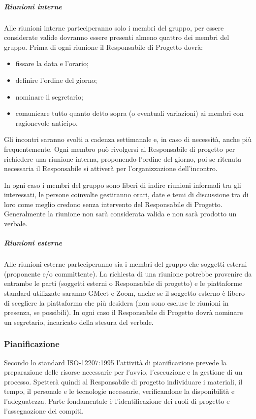\subparagraph{Riunioni interne}
Alle riunioni interne parteciperanno solo i membri del gruppo, per essere considerate valide dovranno essere presenti almeno quattro dei membri del gruppo. Prima di ogni riunione il Responsabile di Progetto dovrà:
\begin{itemize}
\item fissare la data e l'orario;
\item definire l'ordine del giorno;
\item nominare il segretario;
\item comunicare tutto quanto detto sopra (o eventuali variazioni) ai membri con ragionevole anticipo.
\end{itemize}

Gli incontri saranno svolti a cadenza settimanale e, in caso di necessità, anche più frequentemente.
Ogni membro può rivolgersi al Responsabile di progetto per richiedere una riunione interna, proponendo l'ordine del giorno, poi se ritenuta necessaria il Responsabile si attiverà per l'organizzazione dell'incontro.

In ogni caso i membri del gruppo sono liberi di indire riunioni informali tra gli interessati, le persone coinvolte gestiranno orari, date e temi di discussione tra di loro come meglio credono senza intervento del Responsabile di Progetto.
Generalmente la riunione non sarà considerata valida e non sarà prodotto un verbale.

\subparagraph{Riunioni esterne}
Alle riunioni esterne parteciperanno sia i membri del gruppo che soggetti esterni (proponente e/o committente). La richiesta di una riunione potrebbe provenire da entrambe le parti (soggetti esterni o Responsabile di progetto) e le piattaforme standard utilizzate saranno GMeet e Zoom, anche se il soggetto esterno è libero di scegliere la piattaforma che più desidera (non sono escluse le riunioni in presenza, se possibili). In ogni caso il Responsabile di Progetto dovrà nominare un segretario, incaricato della stesura del verbale.


\subsubsection{Pianificazione}
Secondo lo standard ISO-12207:1995 l'attività di pianificazione prevede la preparazione delle risorse necessarie per l'avvio, l'esecuzione e la gestione di un processo. Spetterà quindi al Responsabile di progetto individuare i materiali, il tempo, il personale e le tecnologie necessarie, verificandone la disponibilità e l'adeguatezza. Parte fondamentale è l'identificazione dei ruoli di progetto e l'assegnazione dei compiti.

